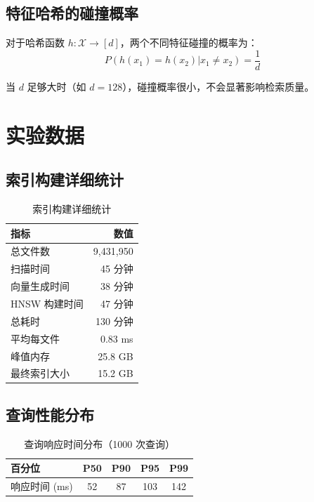 \documentclass[12pt,a4paper]{article}
\begin{document}
\subsection{特征哈希的碰撞概率}

对于哈希函数 $h: \mathcal{X} \rightarrow [d]$，两个不同特征碰撞的概率为：
\begin{equation}
P(h(x_1) = h(x_2) | x_1 \neq x_2) = \frac{1}{d}
\end{equation}

当 $d$ 足够大时（如 $d = 128$），碰撞概率很小，不会显著影响检索质量。

\section{实验数据}

\subsection{索引构建详细统计}

\begin{table}[h]
\centering
\begin{tabular}{@{}lr@{}}
\toprule
\textbf{指标} & \textbf{数值} \\
\midrule
总文件数 & 9,431,950 \\
扫描时间 & 45 分钟 \\
向量生成时间 & 38 分钟 \\
HNSW 构建时间 & 47 分钟 \\
总耗时 & 130 分钟 \\
平均每文件 & 0.83 ms \\
峰值内存 & 25.8 GB \\
最终索引大小 & 15.2 GB \\
\bottomrule
\end{tabular}
\caption{索引构建详细统计}
\end{table}

\subsection{查询性能分布}

\begin{table}[h]
\centering
\begin{tabular}{@{}lcccc@{}}
\toprule
\textbf{百分位} & \textbf{P50} & \textbf{P90} & \textbf{P95} & \textbf{P99} \\
\midrule
响应时间 (ms) & 52 & 87 & 103 & 142 \\
\bottomrule
\end{tabular}
\caption{查询响应时间分布（1000 次查询）}
\end{table}
\end{document}

